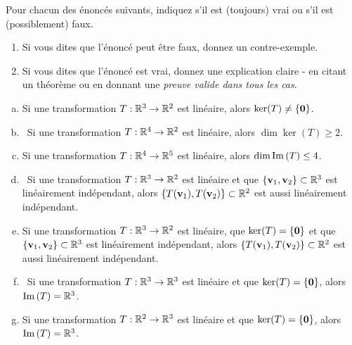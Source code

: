 \begin{prob}
\end{prob} \begin{prob} \label{prob24.3}  Pour chacun des énoncés suivants, indiquez s'il est (toujours) vrai ou s'il est (possiblement) faux.   
   \smallskip    
\begin{enumerate}[$\bullet$]
\item Si vous dites que l'\'enonc\'e peut être faux, donnez un contre-exemple.   
\item Si vous dites que l'\'enonc\'e est vrai, donnez une explication claire - en citant un théorème ou en donnant une {\it preuve valide dans tous les cas}. 
\end{enumerate}
\medskip
\begin{enumerate}[a)]
\item Si une transformation $T:\mathbb{R}^3 \to \mathbb{R}^2$ est lin\'eaire, alors $\ker(T) \not= \{\mathbf{0}\}$.
\medskip
 
\item\sov~Si une transformation $T:\mathbb{R}^4 \to \mathbb{R}^2$ est lin\'eaire, alors $\dim \ker(T) \ge 2$.
\medskip
  
\item Si une transformation $T:\mathbb{R}^4 \to \mathbb{R}^5$ est lin\'eaire, alors $\dim \operatorname{Im}\,(T) \le 4$.
\medskip
 
\item\sov~Si une transformation $T:\mathbb{R}^3 \to \mathbb{R}^2$ est lin\'eaire et que $\{\mathbf{v}_1,\mathbf{v}_2\} \subset \mathbb{R}^3$ est lin\'eairement ind\'ependant, alors $\{T(\mathbf{v}_1),T(\mathbf{v}_2)\} \subset \mathbb{R}^2$ est aussi lin\'eairement ind\'ependant.
\medskip
 
\item Si une transformation $T:\mathbb{R}^3 \to \mathbb{R}^2$ est lin\'eaire, que $\ker(T)=\{\mathbf{0}\}$ et que $\{\mathbf{v}_1,\mathbf{v}_2\} \subset \mathbb{R}^3$  est lin\'eairement ind\'ependant, alors $\{T(\mathbf{v}_1),T(\mathbf{v}_2)\} \subset \mathbb{R}^2$ est aussi lin\'eairement ind\'ependant.
\medskip
 
\item\sov~Si une transformation $T:\mathbb{R}^3 \to \mathbb{R}^3$ est lin\'eaire et que $\ker(T)=\{\mathbf{0}\}$, alors $\operatorname{Im}\,(T)=\mathbb{R}^3$.
\medskip
 
\item Si une transformation $T:\mathbb{R}^2 \to \mathbb{R}^3$ est lin\'eaire et que $\ker(T)=\{\mathbf{0}\}$, alors $\operatorname{Im}\,(T)=\mathbb{R}^3$.

\end{enumerate}


\end{prob}
